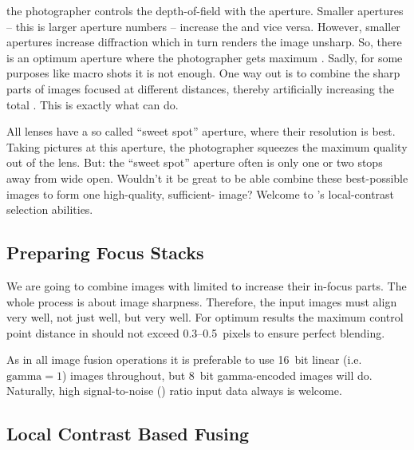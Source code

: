 %
\noindent the photographer controls the depth-of-field with the aperture.  Smaller apertures --
this is larger aperture numbers -- increase the  and vice versa.  However, smaller
apertures increase diffraction which in turn renders the image unsharp.  So, there is an optimum
aperture where the photographer gets maximum .  Sadly, for some purposes like macro
shots it is not enough.  One way out is to combine the sharp parts of images focused at
different distances, thereby artificially increasing the total .  This is exactly
what \App{} can do.

%
%
All lenses have a so called ``sweet spot'' aperture, where their resolution is best.  Taking
pictures at this aperture, the photographer squeezes the maximum quality out of the lens.  But:
the ``sweet spot'' aperture often is only one or two stops away from wide open.  Wouldn't it be
great to be able combine these best-possible images to form one high-quality,
sufficient- image?  Welcome to \App{}'s local-contrast selection abilities.


\subsection[Preparing Focus Stacks]{\label{sec:preparing-focus-stacks}%
  Preparing Focus Stacks}

We are going to combine images with limited  to increase their in-focus parts.  The
whole process is about image sharpness.  Therefore, the input images must align very well, not
just well, but very well.  For optimum results the maximum control point distance in
 should not exceed 0.3--0.5~pixels to ensure perfect blending.

%
%
As in all image fusion operations it is preferable to use 16~bit linear (i.e.\ $\mathrm{gamma} =
1$) images throughout, but 8~bit gamma-encoded images will do.  Naturally, high signal-to-noise
() ratio input data always is welcome.


\subsection[Local Contrast Based Fusing]{\label{sec:local-contrast-based-fusing}%
  Local Contrast Based Fusing}

